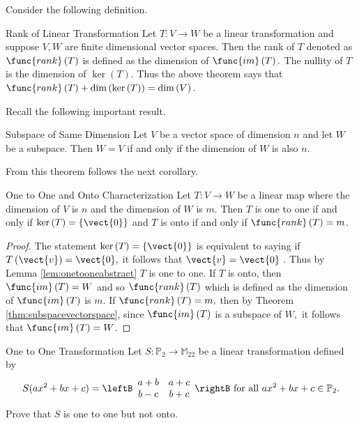 Consider the following definition. 

\begin{definition}{Rank of Linear Transformation}
Let $T:V\rightarrow W$ be a linear transformation and suppose $V,W$ are finite dimensional vector spaces. Then
the rank of $T$ denoted as $\func{rank}\left( T\right) $ is defined as the
dimension of $\func{im}\left( T\right) .$ The nullity of $T$ is the
dimension of $\ker \left( T\right) .$ Thus the above theorem says that $
\func{rank}\left( T\right) +\dim \left( \ker \left( T\right) \right) =\dim
\left( V\right) .$
\end{definition}

Recall the following important result. 

\begin{theorem}{Subspace of Same Dimension}\label{thm:subspacevectorspace}
Let $V$ be a vector space of dimension $n$ and let $W$ be a
subspace. Then $W=V$ if and only if the dimension of $W$ is also $n$.
\end{theorem}

From this theorem follows the next corollary.

\begin{corollary}{One to One and Onto Characterization}\label{cor:oneoneontochar}
Let $T:V\rightarrow W$ be a linear map where the dimension of $V$ is $n$ and
the dimension of $W$ is $m$. Then $T$ is one to one if and only if $\ker
\left( T\right) =\left\{ \vect{0}\right\} $ and $T$ is onto if and only if $
\func{rank}\left( T\right) =m$.
\end{corollary}

\begin{proof}
The statement $\ker \left( T \right) =\left\{ \vect{0}\right\} $
is equivalent to saying if $T \left( \vect{v} \right)=\vect{0},$ it follows that $\vect{v}=\vect{0}$
. Thus by Lemma \ref{lem:onetooneabstract} $T$ is one to one. If $T$ is onto, then $
\func{im}\left( T\right) =W$ and so $\func{rank}\left( T\right) $ which is
defined as the dimension of $\func{im}\left( T\right) $ is $m$. If $\func{
rank}\left( T\right) =m,$ then by Theorem \ref{thm:subspacevectorspace}, since $\func{im}
\left( T\right) $ is a subspace of $W,$ it follows that $\func{im}\left(
T\right) =W$. 
\end{proof}

\begin{example}{One to One Transformation}\label{exa:onetoonekernel}
Let $S:\mathbb{P}_2\to\mathbb{M}_{22}$ be a linear transformation
defined by
\[ S(ax^2+bx+c)
=
\leftB\begin{array}{cc}
a+b & a+c \\ b-c & b+c \end{array}\rightB
\mbox{ for all }
 ax^2+bx+c\in \mathbb{P}_2.\]
Prove that $S$ is one to one but not onto.
\end{example}


